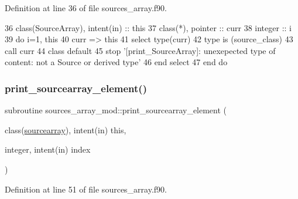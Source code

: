 Definition at line 36 of file sources\+\_\+array.\+f90.


\begin{DoxyCode}
36     \textcolor{keywordtype}{class}(SourceArray), \textcolor{keywordtype}{intent(in)} :: this
37     \textcolor{keywordtype}{class}(*), \textcolor{keywordtype}{pointer} :: curr
38     \textcolor{keywordtype}{integer} :: i
39     \textcolor{keywordflow}{do} i=1, this%
40         curr => this%
41         \textcolor{keywordflow}{select type}(curr)
42 \textcolor{keywordflow}{        type is} (source\_class)
43             \textcolor{keyword}{call }curr%
44 \textcolor{keywordflow}{            class default}
45             stop \textcolor{stringliteral}{'[print\_SourceArray]: unexepected type of content: not a Source or derived type'}
46 \textcolor{keywordflow}{        end select}
47 \textcolor{keywordflow}{    end do}
\end{DoxyCode}
\mbox{\label{namespacesources__array__mod_a83b399b5839262af19adcae73824874e}} 
\subsubsection{\texorpdfstring{print\+\_\+sourcearray\+\_\+element()}{print\_sourcearray\_element()}}
{\footnotesize\ttfamily subroutine sources\+\_\+array\+\_\+mod\+::print\+\_\+sourcearray\+\_\+element (\begin{DoxyParamCaption}\item[{class(\mbox{\hyperlink{structsources__array__mod_1_1sourcearray}{sourcearray}}), intent(in)}]{this,  }\item[{integer, intent(in)}]{index }\end{DoxyParamCaption})\hspace{0.3cm}{\ttfamily [private]}}



Definition at line 51 of file sources\+\_\+array.\+f90.


